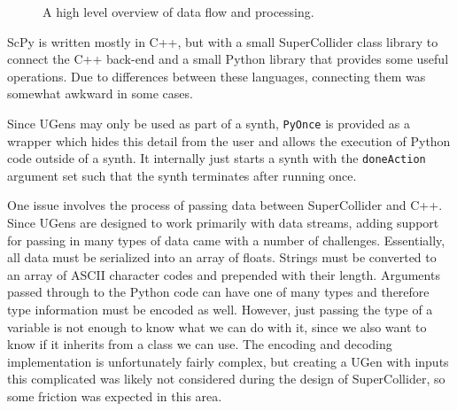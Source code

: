 \documentclass{article}
\begin{document}
\begin{figure}[ht]
    \caption{A high level overview of data flow and processing.}
    \begin{center}
    \end{center}
\end{figure}

ScPy is written mostly in C++, but with a small SuperCollider class library to connect the C++
back-end and a small Python library that provides some useful operations. Due to differences
between these languages, connecting them was somewhat awkward in some cases.

Since UGens may only be used as part of a synth, \texttt{PyOnce} is provided as a wrapper which
hides this detail from the user and allows the execution of Python code outside of a synth. It
internally just starts a synth with the \texttt{doneAction} argument set such that the synth
terminates after running once.

One issue involves the process of passing data between SuperCollider and C++. Since UGens are
designed to work primarily with data streams, adding support for passing in many types of data came
with a number of challenges. Essentially, all data must be serialized into an array of floats.
Strings must be converted to an array of ASCII character codes and prepended with their length.
Arguments passed through to the Python code can have one of many types and therefore type
information must be encoded as well. However, just passing the type of a variable is not enough to
know what we can do with it, since we also want to know if it inherits from a class we can use. The
encoding and decoding implementation is unfortunately fairly complex, but creating a UGen with
inputs this complicated was likely not considered during the design of SuperCollider, so some
friction was expected in this area.
\end{document}

